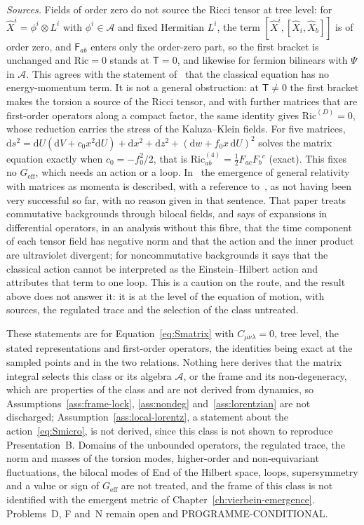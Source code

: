 \emph{Sources.} Fields of order zero do not source the Ricci tensor at tree level: for \(\hat X^i=\phi^i\otimes L^i\) with \(\phi^i\in\mathcal A\) and fixed Hermitian \(L^i\), the term \([\hat X^i,[\hat X_i,\hat X_b]]\) is of order zero, and \(\mathsf F_{ab}\) enters only the order-zero part, so the first bracket is unchanged and \(\mathrm{Ric}=0\) stands at \(\mathsf T=0\), and likewise for fermion bilinears with \(\Psi\) in \(\mathcal A\). This agrees with the statement of~\cite{HanadaKawaiKimura2006} that the classical equation has no energy-momentum term. It is not a general obstruction: at \(\mathsf T\neq0\) the first bracket makes the torsion a source of the Ricci tensor, and with further matrices that are first-order operators along a compact factor, the same identity gives \(\mathrm{Ric}^{(D)}=0\), whose reduction carries the stress of the Kaluza--Klein fields. For five matrices, \(\mathrm ds^2=\mathrm dU(\mathrm dV+c_0x^2\mathrm dU)+\mathrm dx^2+\mathrm dz^2+(\mathrm dw+f_0x\,\mathrm dU)^2\) solves the matrix equation exactly when \(c_0=-f_0^2/2\), that is \(\mathrm{Ric}^{(4)}_{ab}=\tfrac12F_{ac}F_b{}^c\) (exact). This fixes no \(G_{\mathrm{eff}}\), which needs an action or a loop. In~\cite{HoKawaiSteinacker2025} the emergence of general relativity with matrices as momenta is described, with a reference to~\cite{HanadaKawaiKimura2006}, as not having been very successful so far, with no reason given in that sentence. That paper treats commutative backgrounds through bilocal fields, and says of expansions in differential operators, in an analysis without this fibre, that the time component of each tensor field has negative norm and that the action and the inner product are ultraviolet divergent; for noncommutative backgrounds it says that the classical action cannot be interpreted as the Einstein--Hilbert action and attributes that term to one loop. This is a caution on the route, and the result above does not answer it: it is at the level of the equation of motion, with sources, the regulated trace and the selection of the class untreated.

These statements are for Equation~\eqref{eq:Smatrix} with \(C_{\mu\nu\lambda}=0\), tree level, the stated representations and first-order operators, the identities being exact at the sampled points and in the two relations. Nothing here derives that the matrix integral selects this class or its algebra \(\mathcal A\), or the frame and its non-degeneracy, which are properties of the class and are not derived from dynamics, so Assumptions~\ref{ass:frame-lock}, \ref{ass:nondeg} and~\ref{ass:lorentzian} are not discharged; Assumption~\ref{ass:local-lorentz}, a statement about the action~\eqref{eq:Smicro}, is not derived, since this class is not shown to reproduce Presentation~B. Domains of the unbounded operators, the regulated trace, the norm and masses of the torsion modes, higher-order and non-equivariant fluctuations, the bilocal modes of End of the Hilbert space, loops, supersymmetry and a value or sign of \(G_{\mathrm{eff}}\) are not treated, and the frame of this class is not identified with the emergent metric of Chapter~\ref{ch:vierbein-emergence}. Problems~D, F and~N remain open and PROGRAMME-CONDITIONAL.

